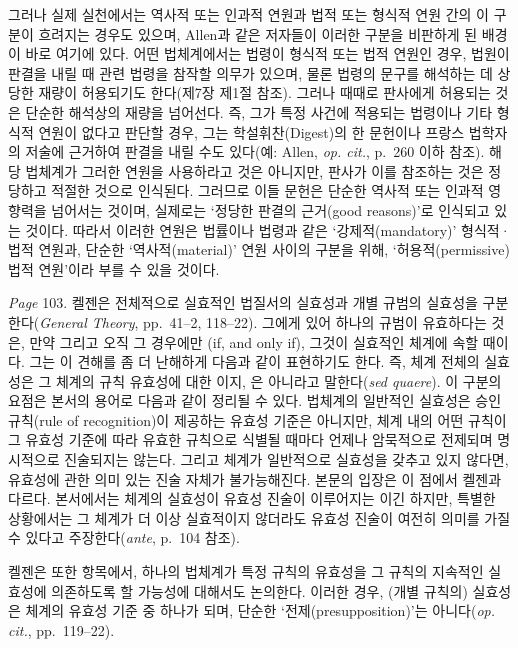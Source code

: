 {그러나 실제 실천에서는 역사적 또는 인과적 연원과 법적 또는 형식적 연원
간의 이 구분이 흐려지는 경우도 있으며, Allen과 같은 저자들이 이러한
구분을 비판하게 된 배경이 바로 여기에 있다. 어떤 법체계에서는 법령이
형식적 또는 법적 연원인 경우, 법원이 판결을 내릴 때 관련 법령을 참작할
의무가 있으며, 물론 법령의 문구를 해석하는 데 상당한 재량이 허용되기도
한다(제7장 제1절 참조). 그러나 때때로 판사에게 허용되는 것은 단순한
해석상의 재량을 넘어선다. 즉, 그가 특정 사건에 적용되는 법령이나 기타
형식적 연원이 없다고 판단할 경우, 그는 학설휘찬(Digest)의 한 문헌이나
프랑스 법학자의 저술에 근거하여 판결을 내릴 수도 있다(예: Allen,
\emph{op. cit.}, p.~260 이하 참조). 해당 법체계가 그러한 연원을
사용하라고  것은 아니지만, 판사가
이를 참조하는 것은 정당하고 적절한 것으로 인식된다. 그러므로 이들 문헌은
단순한 역사적 또는 인과적 영향력을 넘어서는 것이며, 실제로는 `정당한
판결의 근거(good reasons)'로 인식되고 있는 것이다. 따라서 이러한 연원은
법률이나 법령과 같은 `강제적(mandatory)' 형식적·법적 연원과, 단순한
`역사적(material)' 연원 사이의 구분을 위해, `허용적(permissive) 법적
연원'이라 부를 수 있을 것이다.

\emph{Page} 103.  켈젠은 전체적으로 실효적인 법질서의 실효성과 개별 규범의
실효성을 구분한다(\emph{General Theory}, pp.~41--2, 118--22). 그에게
있어 하나의 규범이 유효하다는 것은, 만약 그리고 오직 그 경우에만 (if,
and only if), 그것이  실효적인 체계에
속할 때이다. 그는 이 견해를 좀 더 난해하게 다음과 같이 표현하기도 한다.
즉, 체계 전체의 실효성은 그 체계의 규칙 유효성에 대한
이지, 은 아니라고 말한다(\emph{sed quaere}). 이 구분의 요점은 본서의
용어로 다음과 같이 정리될 수 있다. 법체계의 일반적인 실효성은 승인
규칙(rule of recognition)이 제공하는 유효성 기준은 아니지만, 체계 내의
어떤 규칙이 그 유효성 기준에 따라 유효한 규칙으로 식별될 때마다 언제나
암묵적으로 전제되며 명시적으로 진술되지는 않는다. 그리고 체계가
일반적으로 실효성을 갖추고 있지 않다면, 유효성에 관한 의미 있는 진술
자체가 불가능해진다. 본문의 입장은 이 점에서 켈젠과 다르다. 본서에서는
체계의 실효성이 유효성 진술이 이루어지는 이긴 하지만, 특별한 상황에서는 그 체계가 더 이상 실효적이지
않더라도 유효성 진술이 여전히 의미를 가질 수 있다고
주장한다(\emph{ante}, p.~104 참조).

켈젠은 또한  항목에서, 하나의 법체계가 특정
규칙의 유효성을 그 규칙의 지속적인 실효성에 의존하도록 할 가능성에
대해서도 논의한다. 이러한 경우, (개별 규칙의) 실효성은 체계의 유효성
기준 중 하나가 되며, 단순한 `전제(presupposition)'는 아니다(\emph{op.
cit.}, pp.~119--22).

}
